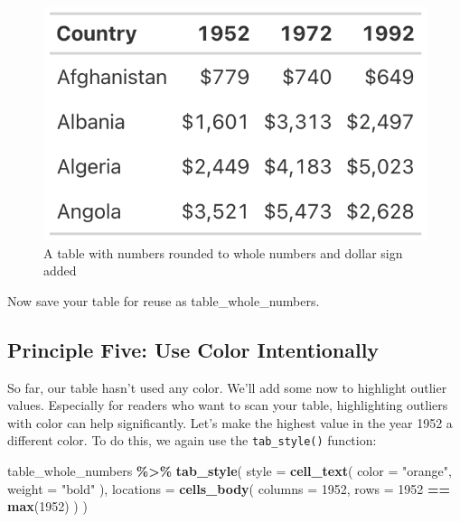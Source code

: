 \documentclass[
]{book}
\newenvironment{Shaded}{\begin{snugshade}}{\end{snugshade}}
\newcommand{\AttributeTok}[1]{\textcolor[rgb]{0.13,0.29,0.53}{#1}}
\newcommand{\FunctionTok}[1]{\textcolor[rgb]{0.13,0.29,0.53}{\textbf{#1}}}
\newcommand{\NormalTok}[1]{#1}
\newcommand{\SpecialCharTok}[1]{\textcolor[rgb]{0.81,0.36,0.00}{\textbf{#1}}}
\newcommand{\StringTok}[1]{\textcolor[rgb]{0.31,0.60,0.02}{#1}}
\begin{document}
\begin{figure}
\includegraphics[width=1\linewidth]{nostarch/temp/F05009} \caption{A table with numbers rounded to whole numbers and dollar sign added}\label{fig:table-whole-numbers}
\end{figure}

Now save your table for reuse as table\_whole\_numbers.

\hypertarget{principle-five-use-color-intentionally}{%
\subsection*{Principle Five: Use Color Intentionally}\label{principle-five-use-color-intentionally}}

So far, our table hasn't used any color. We'll add some now to highlight outlier values. Especially for readers who want to scan your table, highlighting outliers with color can help significantly. Let's make the highest value in the year 1952 a different color. To do this, we again use the \texttt{tab\_style()} function:

\begin{Shaded}
\begin{Highlighting}[]
\NormalTok{table\_whole\_numbers }\SpecialCharTok{\%\textgreater{}\%}
  \FunctionTok{tab\_style}\NormalTok{(}
    \AttributeTok{style =} \FunctionTok{cell\_text}\NormalTok{(}
      \AttributeTok{color =} \StringTok{"orange"}\NormalTok{,}
      \AttributeTok{weight =} \StringTok{"bold"}
\NormalTok{    ),}
    \AttributeTok{locations =} \FunctionTok{cells\_body}\NormalTok{(}
      \AttributeTok{columns =} \StringTok{\textasciigrave{}}\AttributeTok{1952}\StringTok{\textasciigrave{}}\NormalTok{,}
      \AttributeTok{rows =} \StringTok{\textasciigrave{}}\AttributeTok{1952}\StringTok{\textasciigrave{}} \SpecialCharTok{==} \FunctionTok{max}\NormalTok{(}\StringTok{\textasciigrave{}}\AttributeTok{1952}\StringTok{\textasciigrave{}}\NormalTok{)}
\NormalTok{    )}
\NormalTok{  )}
\end{Highlighting}
\end{Shaded}
\end{document}
